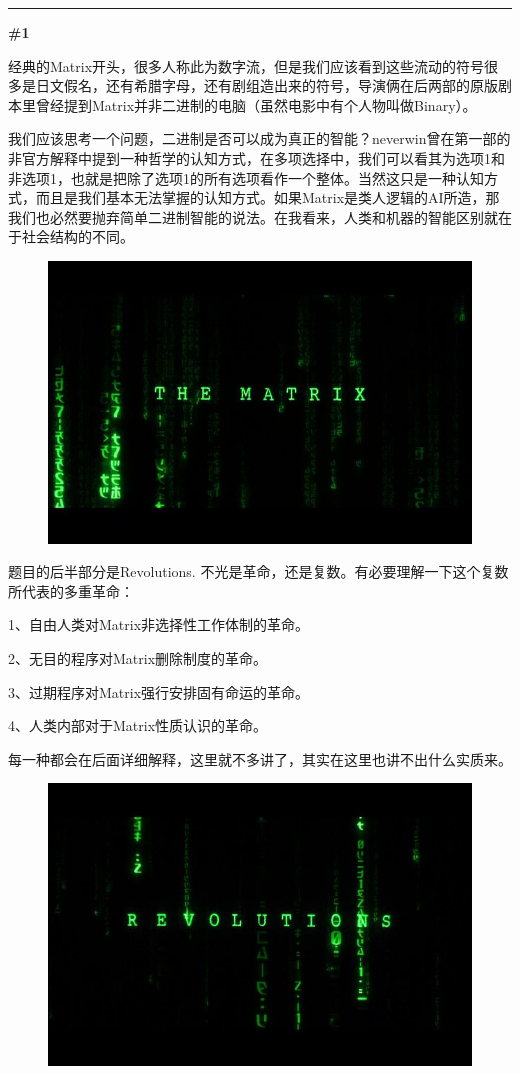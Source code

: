 \documentclass[UTF8]{ctexart}
\newcommand{\myparsep}{\noindent \rule[0.5ex]{\linewidth}{1pt}}
\newcommand{\mysection}[1]{\vspace{1ex} {\centering \bf \#1 \par} \vspace{1ex}}
\begin{document}
\myparsep

\vspace*{\fill}
\mysection{正文开始}
\vspace*{\fill}

\newpage

经典的Matrix开头，很多人称此为数字流，但是我们应该看到这些流动的符号很多是日文假名，还有希腊字母，还有剧组造出来的符号，导演俩在后两部的原版剧本里曾经提到Matrix并非二进制的电脑（虽然电影中有个人物叫做Binary）。

我们应该思考一个问题，二进制是否可以成为真正的智能？neverwin曾在第一部的非官方解释中提到一种哲学的认知方式，在多项选择中，我们可以看其为选项1和非选项1，也就是把除了选项1的所有选项看作一个整体。当然这只是一种认知方式，而且是我们基本无法掌握的认知方式。如果Matrix是类人逻辑的AI所造，那我们也必然要抛弃简单二进制智能的说法。在我看来，人类和机器的智能区别就在于社会结构的不同。

\begin{figure}[htb]
\centering
\includegraphics[width=0.5\linewidth]{fig/eeeb9f515ea2062442a75b17.jpg}
\end{figure}

题目的后半部分是Revolutions. 不光是革命，还是复数。有必要理解一下这个复数所代表的多重革命：

1、自由人类对Matrix非选择性工作体制的革命。

2、无目的程序对Matrix删除制度的革命。

3、过期程序对Matrix强行安排固有命运的革命。

4、人类内部对于Matrix性质认识的革命。

每一种都会在后面详细解释，这里就不多讲了，其实在这里也讲不出什么实质来。

\begin{figure}[htb]
\centering
\includegraphics[width=0.5\linewidth]{fig/0b330eb35d354ba7d9335a17.jpg}
\end{figure}
\end{document}
